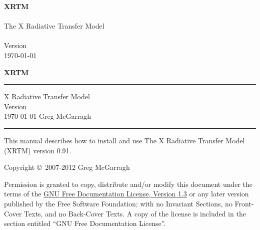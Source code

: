 \newcommand\createarg[1]{\xref{xrtm_create}{\sourcenamearg{#1}}}

\newcommand\interror[1]{#1 or \xref{XRTM_INT_ERROR}{XRTM\_\-INT\_\-ERROR} on error.}
\newcommand\dblerror[1]{#1 or \xref{XRTM_DBL_ERROR}{XRTM\_\-DBL\_\-ERROR} on error.}

\newcommand\interrornoret{\interror{Zero with successful completion}}
\newcommand\dblerrornoret{\dblerror{Zero with successful completion}}


%


%





\frontmatter


\iftth
\begin{center}
{\huge \bfseries XRTM} \\ \\
The X Radiative Transfer Model \\ \\
Version \version \\
\today
\end{center}
\else
\begin{titlepage}
\vspace*{1.25in}
{\noindent \huge \bfseries XRTM} \\
\rule{\linewidth}{3.0pt}
\flushright
X Radiative Transfer Model \\
Version \version \\
\usdate\today
\vfill
\flushleft
\Large Greg McGarragh
\rule{\linewidth}{1.5pt}
\end{titlepage}
\fi


%
\null
\iftth
\vspace{0.25in}
\else
\vfill
\fi
{
\setlength{\parskip}{7.5pt}

\noindent
This manual describes how to install and use The X Radiative Transfer Model (XRTM) version 0.91.

\noindent
Copyright \copyright \ 2007-2012 Greg McGarragh

\noindent
Permission is granted to copy, distribute and/or modify this document under the terms of the \href{http://www.gnu.org/licenses/fdl-1.3.html}{GNU Free Documentation License, Version 1.3} or any later version published by the Free Software Foundation; with no Invariant Sections, no Front-Cover Texts, and no Back-Cover Texts.  A copy of the license is included in the section entitled ``GNU Free Documentation License''.
}


